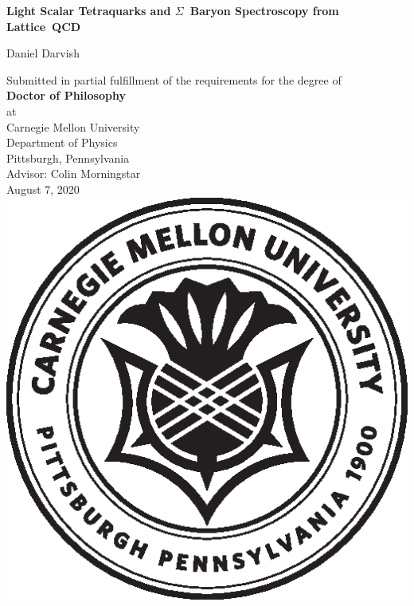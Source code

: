 \begin{titlepage}
    \begin{center}
        
        \linespread{1.0}\huge \textbf{Light Scalar Tetraquarks and \mbox{$\Sigma$ Baryon} Spectroscopy from \mbox{Lattice QCD}}
        
        \linespread{1.3}
        
        \vfill
 
        {\Large Daniel Darvish}
        \large
        \vfill
             
        Submitted in partial fulfillment of the requirements for the degree of\\
        \vspace{0.5cm}
        \textbf{Doctor of Philosophy}\\
        \vspace{0.5cm}
        at\\
        \vspace{0.5cm}
        Carnegie Mellon University\\
        Department of Physics\\
        Pittsburgh, Pennsylvania\\
        \vspace{1cm}
        Advisor: Colin Morningstar\\
        \vspace{1cm}
        August 7, 2020
        \vfill
        \includegraphics[scale=0.6]{figures/cmu.eps}
    \end{center}
 \end{titlepage}